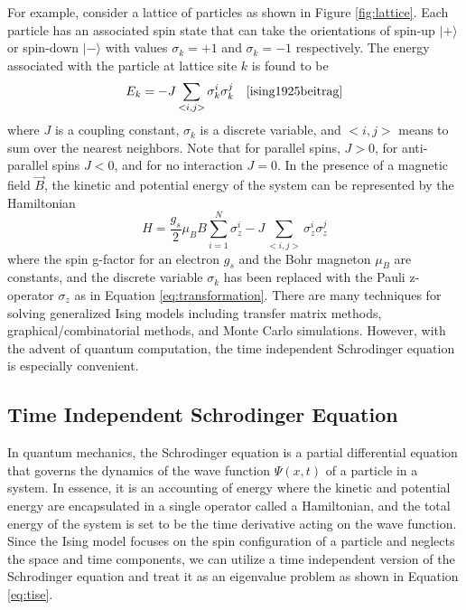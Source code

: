 		For example, consider a lattice of particles as shown in Figure \ref{fig:lattice}. 
		Each particle has an associated spin state that can take the orientations of spin-up $|+\rangle$ or spin-down $|-\rangle$ with values $\sigma_k = +1$ and $\sigma_k = -1$ respectively. The energy associated with the particle at lattice site $k$ is found to be 
		\begin{equation}
			 E_k= - J\sum_{<i,j>}\sigma_k^i\sigma_k^j \quad \cite{ising1925beitrag}
			\label{eq:latticeSiteEnergy}
		\end{equation}
		where $J$ is a coupling constant, $\sigma_k$ is a discrete variable, and $<i,j>$ means to sum over the nearest neighbors. Note that for parallel spins, $J>0$, for anti-parallel spins $J<0$, and for no interaction $J = 0$. 
		In the presence of a magnetic field $\vec{B}$, the kinetic and potential energy of the system can be represented by the Hamiltonian
		\begin{equation}
			H = \frac{g_s}{2}\mu_B B\sum_{i=1}^N \sigma_z^i - J\sum_{<i,j>}\sigma_z^i\sigma_z^j
			\label{eq:isingHamiltonian}
		\end{equation} 
		where the spin g-factor for an electron $g_s$ and the Bohr magneton $\mu_B$ are constants, and the discrete variable $\sigma_k$ has been replaced with the Pauli z-operator $\sigma_z$ as in Equation \ref{eq:transformation}. 
		There are many techniques for solving generalized Ising models including transfer matrix methods\cite{onsager1944crystal}, graphical/combinatorial methods\cite{feynman1972statistical}, and Monte Carlo simulations\cite{schroeder2011thermal}. 
		However, with the advent of quantum computation, the time independent Schrodinger equation is especially convenient.  
	\subsection{Time Independent Schrodinger Equation}
		In quantum mechanics, the Schrodinger equation is a partial differential equation that governs the dynamics of the wave function $\Psi(x,t)$ of a particle in a system. 
		In essence, it is an accounting of energy where the kinetic and potential energy are encapsulated in a single operator called a Hamiltonian, and the total energy of the system is set to be the time derivative acting on the wave function. 
		Since the Ising model focuses on the spin configuration of a particle and neglects the space and time components, we can utilize a time independent version of the Schrodinger equation and treat it as an eigenvalue problem as shown in Equation \ref{eq:tise}. 
		
